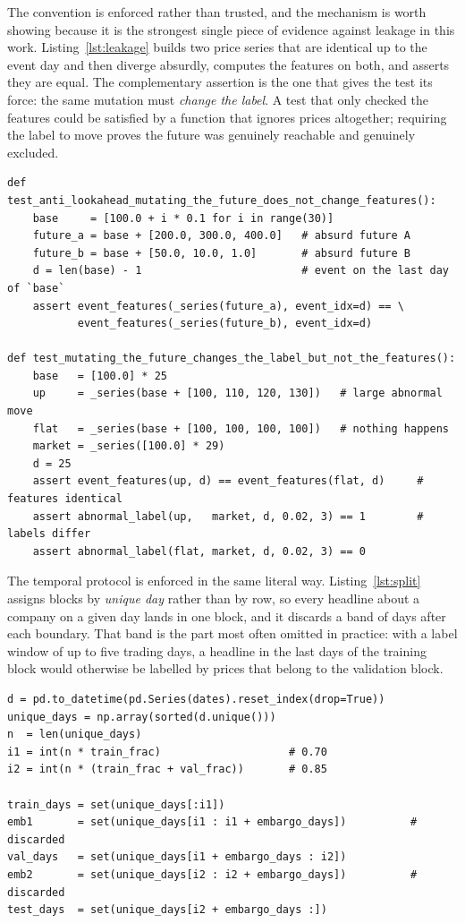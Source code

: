 The convention is enforced rather than trusted, and the mechanism is worth showing because it is the
strongest single piece of evidence against leakage in this work. Listing~\ref{lst:leakage} builds two
price series that are identical up to the event day and then diverge absurdly, computes the features
on both, and asserts they are equal. The complementary assertion is the one that gives the test its
force: the same mutation must \emph{change the label}. A test that only checked the features could be
satisfied by a function that ignores prices altogether; requiring the label to move proves the future
was genuinely reachable and genuinely excluded.

\begin{lstlisting}[caption={The anti-lookahead test. Mutating the future must leave every feature
untouched and must change the label.}, label={lst:leakage}]
def test_anti_lookahead_mutating_the_future_does_not_change_features():
    base     = [100.0 + i * 0.1 for i in range(30)]
    future_a = base + [200.0, 300.0, 400.0]   # absurd future A
    future_b = base + [50.0, 10.0, 1.0]       # absurd future B
    d = len(base) - 1                         # event on the last day of `base`
    assert event_features(_series(future_a), event_idx=d) == \
           event_features(_series(future_b), event_idx=d)

def test_mutating_the_future_changes_the_label_but_not_the_features():
    base   = [100.0] * 25
    up     = _series(base + [100, 110, 120, 130])   # large abnormal move
    flat   = _series(base + [100, 100, 100, 100])   # nothing happens
    market = _series([100.0] * 29)
    d = 25
    assert event_features(up, d) == event_features(flat, d)     # features identical
    assert abnormal_label(up,   market, d, 0.02, 3) == 1        # labels differ
    assert abnormal_label(flat, market, d, 0.02, 3) == 0
\end{lstlisting}

The temporal protocol is enforced in the same literal way. Listing~\ref{lst:split} assigns blocks by
\emph{unique day} rather than by row, so every headline about a company on a given day lands in one
block, and it discards a band of days after each boundary. That band is the part most often omitted
in practice: with a label window of up to five trading days, a headline in the last days of the
training block would otherwise be labelled by prices that belong to the validation block.

\begin{lstlisting}[caption={Temporal split by unique day, with an embargo band after each
boundary.}, label={lst:split}]
d = pd.to_datetime(pd.Series(dates).reset_index(drop=True))
unique_days = np.array(sorted(d.unique()))
n  = len(unique_days)
i1 = int(n * train_frac)                    # 0.70
i2 = int(n * (train_frac + val_frac))       # 0.85

train_days = set(unique_days[:i1])
emb1       = set(unique_days[i1 : i1 + embargo_days])          # discarded
val_days   = set(unique_days[i1 + embargo_days : i2])
emb2       = set(unique_days[i2 : i2 + embargo_days])          # discarded
test_days  = set(unique_days[i2 + embargo_days :])
\end{lstlisting}


